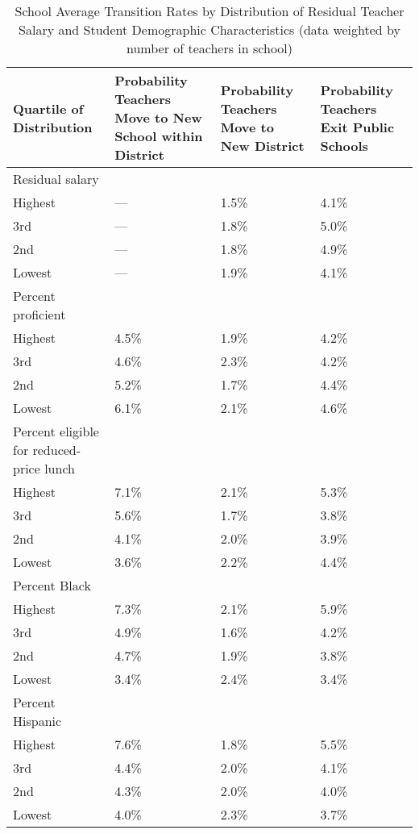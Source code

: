 \documentclass[12pt,]{article}
\begin{document}
\begin{table}[htbp]
\centering
\begin{tabular}{p{}p{}p{}p{}}
  \hline
Quartile of Distribution & Probability Teachers Move to New School within District & Probability Teachers Move to New District & Probability Teachers Exit Public Schools \\ 
  \hline
Residual salary & & & \\
\quad Highest & --- & 1.5\% & 4.1\% \\ 
  \quad 3rd & --- & 1.8\% & 5.0\% \\ 
  \quad 2nd & --- & 1.8\% & 4.9\% \\ 
  \quad Lowest & --- & 1.9\% & 4.1\% \\ 
Percent proficient & & & \\
  \quad Highest & 4.5\% & 1.9\% & 4.2\% \\ 
  \quad 3rd & 4.6\% & 2.3\% & 4.2\% \\ 
  \quad 2nd & 5.2\% & 1.7\% & 4.4\% \\ 
  \quad Lowest & 6.1\% & 2.1\% & 4.6\% \\ 
Percent eligible for reduced-price lunch & & & \\
  \quad Highest & 7.1\% & 2.1\% & 5.3\% \\ 
  \quad 3rd & 5.6\% & 1.7\% & 3.8\% \\ 
  \quad 2nd & 4.1\% & 2.0\% & 3.9\% \\ 
  \quad Lowest & 3.6\% & 2.2\% & 4.4\% \\ 
Percent Black & & & \\
  \quad Highest & 7.3\% & 2.1\% & 5.9\% \\ 
  \quad 3rd & 4.9\% & 1.6\% & 4.2\% \\ 
  \quad 2nd & 4.7\% & 1.9\% & 3.8\% \\ 
  \quad Lowest & 3.4\% & 2.4\% & 3.4\% \\ 
Percent Hispanic & & & \\
  \quad Highest & 7.6\% & 1.8\% & 5.5\% \\ 
  \quad 3rd & 4.4\% & 2.0\% & 4.1\% \\ 
  \quad 2nd & 4.3\% & 2.0\% & 4.0\% \\ 
  \quad Lowest & 4.0\% & 2.3\% & 3.7\% \\ 
   \hline
\end{tabular}
\caption{School Average Transition Rates by Distribution of Residual Teacher Salary and Student Demographic Characteristics (data weighted by number of teachers in school)} 
\label{tbl:change_by_quartile}
\end{table}
\end{document}
